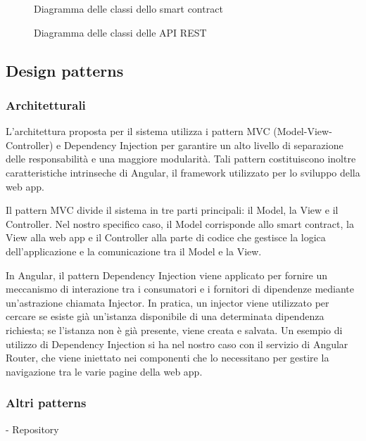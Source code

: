 \begin{figure}[H]
    
    \caption{Diagramma delle classi dello smart contract}\label{fig:contract}
\end{figure}

\begin{figure}[H]
    
    \caption{Diagramma delle classi delle API REST}\label{fig:apirest}
\end{figure}

\subsection{Design patterns}

\subsubsection{Architetturali}
L'architettura proposta per il sistema utilizza i pattern MVC (Model-View-Controller) e Dependency Injection per garantire un alto livello di separazione delle responsabilità e una maggiore modularità. Tali pattern costituiscono inoltre caratteristiche intrinseche di Angular, il framework utilizzato per lo sviluppo della web app.

Il pattern MVC divide il sistema in tre parti principali: il Model, la View e il Controller. Nel nostro specifico caso, il Model corrisponde allo smart contract, la View alla web app e il Controller alla parte di codice che gestisce la logica dell'applicazione e la comunicazione tra il Model e la View.

In Angular, il pattern Dependency Injection viene applicato per fornire un meccanismo di interazione tra i consumatori e i fornitori di dipendenze mediante un'astrazione chiamata Injector. In pratica, un injector viene utilizzato per cercare se esiste già un'istanza disponibile di una determinata dipendenza richiesta; se l'istanza non è già presente, viene creata e salvata. Un esempio di utilizzo di Dependency Injection si ha nel nostro caso con il servizio di Angular Router, che viene iniettato nei componenti che lo necessitano per gestire la navigazione tra le varie pagine della web app.

\subsubsection{Altri patterns}
- Repository
